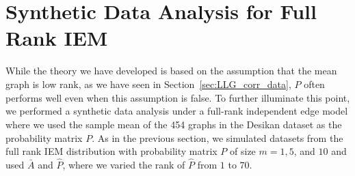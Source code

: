%
%
%








\section{Synthetic Data Analysis for Full Rank IEM}
\label{sec:sim_iem}

While the theory we have developed is based on the assumption that the mean graph is low rank, as we have seen in Section~\ref{sec:LLG_corr_data}, $\hat{P}$ often performs well even when this assumption is false. 
To further illuminate this point, we performed a synthetic data analysis under a full-rank independent edge model where we used the sample mean of the 454 graphs in the Desikan dataset as the probability matrix $P$.
As in the previous section, we simulated datasets from the full rank IEM distribution with probability matrix $P$ of size $m=1,5$, and $10$ and used $\bar{A}$ and $\hat{P}$, where we varied the rank of $\hat{P}$ from $1$ to $70$.

